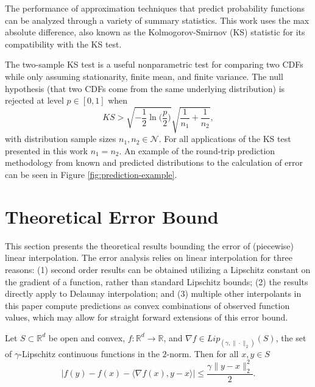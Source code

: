 \documentclass[smallextended,final]{svjour3}  %
\begin{document}
The performance of approximation techniques that predict probability
functions can be analyzed through a variety of summary
statistics. This work uses the max absolute difference, also known as
the Kolmogorov-Smirnov (KS) statistic \cite{lilliefors1967kolmogorov}
for its compatibility with the KS test.

The two-sample KS test is a useful nonparametric test for comparing
two CDFs while only assuming stationarity, finite mean, and finite
variance. The null hypothesis (that two CDFs come from the same
underlying distribution) is rejected at level $p \in [0,1]$ when
 $$ KS > \sqrt{-\frac{1}{2}\ln\biggl(\frac{p}{2}\biggr)} \sqrt{\frac{1}{n_1} + \frac{1}{n_2}}, $$
with distribution sample sizes $n_1,n_2 \in \mathcal{N}$. For all
applications of the KS test presented in this work $n_1 = n_2$. An
example of the round-trip prediction methodology from known and
predicted distributions to the calculation of error can be seen in
Figure \ref{fig:prediction-example}.

\section{Theoretical Error Bound}
\label{sec:theory}

This section presents the theoretical results bounding the error of
(piecewise) linear interpolation. The error analysis relies on linear
interpolation for three reasons: (1) second order results can be
obtained utilizing a Lipschitz constant on the gradient of a function,
rather than standard Lipschitz bounds; (2) the results directly apply
to Delaunay interpolation; and (3) multiple other interpolants in this
paper compute predictions as convex combinations of observed function
values, which may allow for straight forward extensions of this error
bound.

\begin{plainlemma}
  \label{lemma:1}
  Let $S \subset \mathbb{R}^d$ be open and convex, $f: \mathbb{R}^d
  \rightarrow \mathbb{R}$, and $\nabla f \in
  Lip_{(\gamma,\|\cdot\|_2)}(S)$, the set of $\gamma$-Lipschitz
  continuous functions in the $2$-norm. Then for all $x,y \in S$
  $$\big|f(y) - f(x) - \langle \nabla f(x), y - x \rangle \big| \leq \frac{\gamma \|y - x\|_2^2}{2}.$$
\end{plainlemma}
\end{document}
